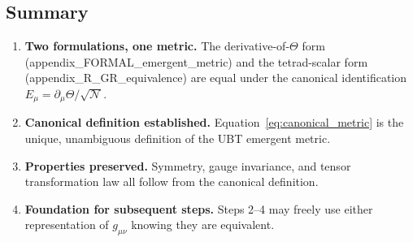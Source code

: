 \documentclass[12pt]{article}
\theoremstyle{definition}
\theoremstyle{remark}
\begin{document}
\subsection{Summary}

\begin{enumerate}
  \item \textbf{Two formulations, one metric.}  The derivative-of-$\Theta$ form
        (appendix\_FORMAL\_emergent\_metric) and the tetrad-scalar form
        (appendix\_R\_GR\_equivalence) are equal under the canonical identification
        $E_\mu = \partial_\mu\Theta/\sqrt{\mathcal{N}}$.
  \item \textbf{Canonical definition established.}  Equation~\eqref{eq:canonical_metric}
        is the unique, unambiguous definition of the UBT emergent metric.
  \item \textbf{Properties preserved.}  Symmetry, gauge invariance, and tensor
        transformation law all follow from the canonical definition.
  \item \textbf{Foundation for subsequent steps.}  Steps 2--4 may freely use either
        representation of $g_{\mu\nu}$ knowing they are equivalent.
\end{enumerate}

\ifdefined\INCLUDEMODE
\else
  
\end{document}
